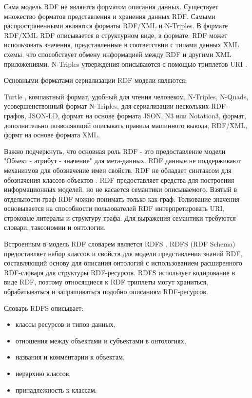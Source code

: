 Сама модель RDF не является форматом описания данных. Существует множество форматов представления и хранения данных RDF. Самыми распространенными являются форматы RDF/XML и N-Triples. В формате RDF/XML RDF описывается в структурном виде, в формате. RDF может использовать значения, представленные в соответствии с типами данных XML схемы, что способствует обмену информацией между RDF и другими XML приложениями. N-Triples утверждения описываются с помощью триплетов URI \cite{beckett2004rdf}. 

Основными форматами сериализации RDF модели являются:

Turtle \cite{beckett2014rdf}, компактный формат, удобный для чтения человеком,
N-Triples,
N-Quads, усовершенствонный формат N-Triples, для сериализации нескольких RDF-графов,
JSON-LD, формат на основе формата JSON,
N3 или Notation3, формат,  дополнительно позволяющий описывать правила машинного вывода,
RDF/XML, формт на основе формата XML.


Важно подчеркнуть, что основная роль RDF - это предоставление модели "Объект - атрибут - значение" для мета-данных. RDF данные не поддерживают механизмов для обозначение имен свойств. RDF не обладает синтаксом для обозначения классов объектов \cite{decker2000semantic}. RDF предоставляет средства для построения информационных моделей, но не касается семантики описываемого. Взятый в отдельности граф RDF можно понимать только как граф. Толкование значения основывается на способности пользователей RDF интерпретировать URI, строковые литералы и структуру графа. Для выражения семантики требуются словари, таксономии и онтологии. 

Встроенным в модель RDF словарем является RDFS \cite{brickley2000resource}\cite{nejdl2000rdf}. RDFS (RDF Schema) предоставляет набор классов и свойств для модели представления знаний RDF, составляющий основу для описания онтологий с использованием расширенного RDF-словаря для структуры RDF-ресурсов. RDFS использует кодирование в виде RDF, поэтому относящиеся к RDF триплеты могут храниться, обрабатываться и запрашиваться подобно описаниям RDF-ресурсов. 

Словарь RDFS описывает:
\begin{itemize}
\item классы ресурсов и типов данных, 
\item отношения между объектами и субъектами в онтологиях,
\item названия и комментарии к объектам,
\item иерархию классов,
\item принадлежность к классам.
\end{itemize}


